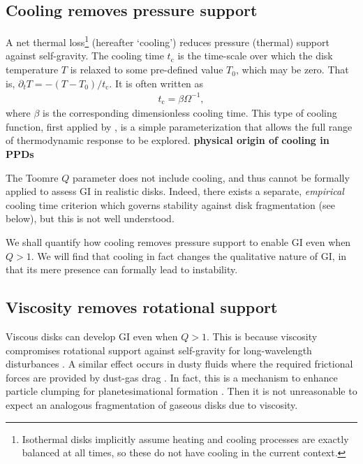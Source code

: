 \documentclass[iop, numberedappendix]{emulateapj}
\newcommand{\p}{\partial}
\newcommand{\tcool}{t_\mathrm{c}}
\begin{document}


\subsection{Cooling removes pressure support}
A net thermal loss\footnote{Isothermal disks implicitly assume 
  heating and cooling processes are exactly balanced at all
  times, so these do not have cooling in the current context.} (hereafter `cooling')
reduces pressure (thermal) support against self-gravity. The cooling time 
$\tcool$ is the time-scale over which the disk temperature $T$ is relaxed
to some pre-defined value $T_0$, which may be zero. That is, $\p_t T =
-(T-T_0)/\tcool$. It is often written as 
\begin{align} 
  \tcool = \beta \Omega^{-1},
\end{align}
where $\beta$ is the corresponding dimensionless cooling time. This
type of cooling function, first applied by \cite{gammie01}, is a
simple parameterization that allows the full range of thermodynamic
response to be explored. 
{\bf physical origin of cooling in PPDs}

The Toomre $Q$ parameter does not include cooling, and thus cannot be
formally applied to assess GI in realistic disks. Indeed, there exists
a separate, \emph{empirical} cooling time criterion which governs
stability against disk fragmentation (see below), but this is not well
understood.     

We shall quantify how cooling removes pressure
support to enable GI even when $Q>1$. 
We will find that cooling in fact changes the 
qualitative nature of GI, in that its mere presence can
formally lead to instability.  

\subsection{Viscosity removes rotational support}
Viscous disks can develop GI even when $Q>1$. This is because
viscosity compromises rotational support against self-gravity for
long-wavelength disturbances
\citep{lynden-bell74,willerding92,gammie96}. A similar effect  
occurs in dusty fluids where the required frictional forces are 
provided by dust-gas drag \citep{ward00, takahashi14}. In fact, this
is a mechanism to enhance particle clumping for planetesimational formation 
\citep{youdin11}. Then it is not unreasonable to expect an analogous
fragmentation of gaseous disks due to viscosity.   
\end{document}
